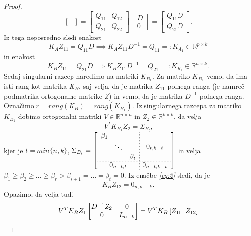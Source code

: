 \documentclass[mat1]{article}
\begin{document}
\begin{proof}
$$\begin{bmatrix}
\end{bmatrix} = 
\begin{bmatrix}
Q_{11} & Q_{12} \\ 
Q_{21} & Q_{22}
\end{bmatrix}
\begin{bmatrix}
D \\ 
0
\end{bmatrix} =
\begin{bmatrix}
Q_{11} D \\ 
Q_{21} D
\end{bmatrix} \text{.}
$$
Iz tega neposredno sledi enakost
$$
K_A Z_{11} = Q_{11} D \implies K_A Z_{11} D^{-1} = Q_{11} =: K_{A_1}  \in \mathbb{R}^{p \times k} %
$$
in enakost
$$
K_B Z_{11} = Q_{21} D \implies K_B Z_{11} D^{-1} = Q_{21} =: K_{B_1} \in \mathbb{R}^{ n \times k} \text{.}
$$
Sedaj singularni razcep naredimo na matriki $K_{B_1}$. Za matriko $K_{B_1}$ vemo, da ima isti rang kot matrika $K_B$, saj velja, da je matrika $Z_{11}$ polnega ranga (je namreč podmatrika ortogonalne matrike $Z$) in vemo, da je matrika $D^{-1}$ polnega ranga. Označimo $r = rang(K_B) = rang(K_{B_1})$. Iz singularnega razcepa za matriko $K_{B_1}$ dobimo ortogonalni matriki $V \in \mathbb{R}^{ n \times n}$ in $Z_2 \in \mathbb{R}^{ k \times k}$, da velja
\begin{equation}
V^T K_{B_1} Z_2 = \Sigma_{B_t}
 \text{,}  \label{eq:3}
\end{equation}
kjer je $t = min\{n, k\}$, 
$\Sigma_{B_t} = 
\left[
\begin{array}{c;{2pt/2pt}c}
\begin{matrix}
\beta_1 & & \\
 & \ddots & \\
 & & \beta_t
\end{matrix} & 0_{t, k - t}
 \\ \hdashline[2pt/2pt]
0_{n-t, t} & 0_{n-t, k-t}
\end{array} \right]$
in velja 
$ \beta_1 \geq \beta_2 \geq \ldots \geq \beta_r > \beta_{r+1} = \ldots = \beta_t = 0 \text{.}$ 
\newline
Iz enačbe \textit{\eqref{eq:2}} sledi, da je
$$
K_B Z_{12} = 0_{n, m-k} \text{.}
$$
Opazimo, da velja tudi
\begin{gather*}
V^T K_B Z_1
\begin{bmatrix}
D^{-1} Z_2 & 0\\ 
0 & I_{m-k}
\end{bmatrix} = 
V^T K_B \left[ Z_{11} \hspace{2mm} Z_{12} \right]

\end{gather*}
\end{proof}
\end{document}
